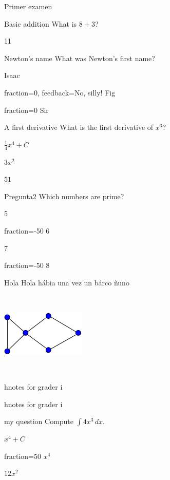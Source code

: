 \documentclass[12pt]{article}
\begin{document}
\begin{quiz}{Primer examen}

\begin{numerical}{Basic addition}
What is $8+3$?
\item 11
\end{numerical}
\begin{shortanswer}[case sensitive=true]{Newton’s name}
What was Newton’s first name?
\item Isaac
\item[fraction=0, feedback={No, silly!}] Fig
\item{fraction=0} Sir
\end{shortanswer}
\begin{multi}{A first derivative}
What is the first derivative of $x^3$?
\item $\frac{1}{4} x^4+C$
\item* $3x^2$
\item $51$
\end{multi}
\begin{multi}[multiple]{Pregunta2}
Which numbers are prime?
\item* 5
\item[fraction=-50] 6
\item* 7
\item[fraction=-50] 8
\end{multi}



\begin{essay}[response format=file,attachments allowed=1]{Hola}
Hola hábia una vez un bárco ñuno
\begin{center}
\includegraphics[width=4cm,height=4cm,ppi=100]{imagenes/grafo.png}
\end{center}
\item hnotes for grader i
\item hnotes for grader i
\end{essay}
\begin{multi}{my question}
Compute $\int 4x^3\,dx$.
\item* $x^4+C$
\item[fraction=50] $x^4$
\item $12x^2$
\end{multi}
\end{quiz}
\end{document}
